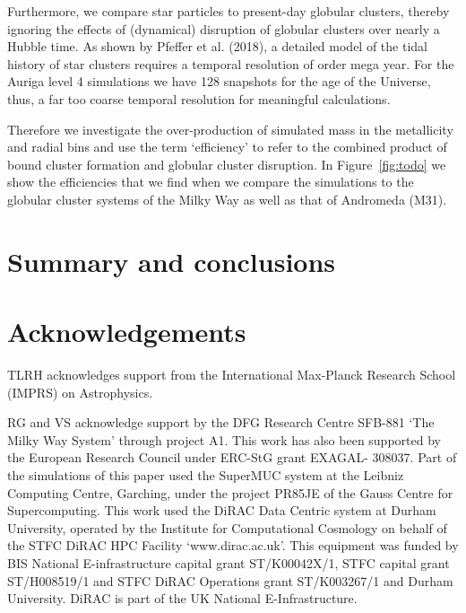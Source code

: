 \documentclass[a4paper,fleqn,usenatbib]{mnras}
\begin{document}
Furthermore, we compare star particles to present-day globular clusters, thereby
ignoring the effects of (dynamical) disruption of globular clusters over nearly
a Hubble time. As shown by Pfeffer et al. (2018), a detailed model of the tidal
history of star clusters requires a temporal resolution of order mega year. For
the Auriga level 4 simulations we have 128 snapshots for the age of the Universe,
thus, a far too coarse temporal resolution for meaningful calculations.

Therefore we investigate the over-production of simulated mass in the metallicity
and radial bins and use the term `efficiency' to refer to the combined product
of bound cluster formation and globular cluster disruption. In Figure~\ref{fig:todo}
we show the efficiencies that we find when we compare the simulations to the
globular cluster systems of the Milky Way as well as that of Andromeda (M31).




\section{Summary and conclusions}
\label{sec:conclusions}


\section*{Acknowledgements}
TLRH acknowledges support from the International Max-Planck Research School (IMPRS) on Astrophysics.


RG and VS acknowledge support by the DFG Research Centre SFB-881 `The
Milky Way System' through project A1. This work has also been
supported by the European Research Council under ERC-StG grant
EXAGAL- 308037. Part of the simulations of this paper used the
SuperMUC system at the Leibniz Computing Centre, Garching,
under the project PR85JE of the Gauss Centre for Supercomputing.
This work used the DiRAC Data Centric system at Durham
University, operated by the Institute for Computational Cosmology
on behalf of the STFC DiRAC HPC Facility `www.dirac.ac.uk'.
This equipment was funded by BIS National E-infrastructure capital
grant ST/K00042X/1, STFC capital grant ST/H008519/1 and
STFC DiRAC Operations grant ST/K003267/1 and Durham University.
DiRAC is part of the UK National E-Infrastructure.


\end{document}
